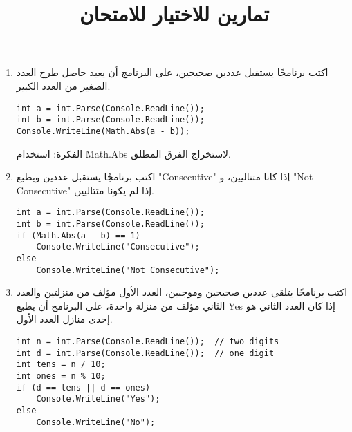 ﻿\documentclass[12pt]{article}
\title{تمارين للاختيار للامتحان}
\begin{document}
\maketitle
\thispagestyle{fancy}

\begin{enumerate}[itemsep=2em]
\item
اكتب برنامجًا يستقبل عددين صحيحين، على البرنامج أن يعيد حاصل طرح العدد الصغير من العدد الكبير.

\ifwithsols
\begin{boxSolution}
\begin{english}
\begin{verbatim}
int a = int.Parse(Console.ReadLine());
int b = int.Parse(Console.ReadLine());
Console.WriteLine(Math.Abs(a - b));
\end{verbatim}
\end{english}
الفكرة: استخدام \textenglish{Math.Abs} لاستخراج الفرق المطلق.
\end{boxSolution}
\fi


\item
اكتب برنامجًا يستقبل عددين ويطبع \textenglish{"Consecutive"} إذا كانا متتاليين، و \textenglish{"Not Consecutive"} إذا لم يكونا متتاليين.

\ifwithsols
\begin{boxSolution}
\begin{english}
\begin{verbatim}
int a = int.Parse(Console.ReadLine());
int b = int.Parse(Console.ReadLine());
if (Math.Abs(a - b) == 1)
    Console.WriteLine("Consecutive");
else
    Console.WriteLine("Not Consecutive");
\end{verbatim}
\end{english}
\end{boxSolution}
\fi


\item
اكتب برنامجًا يتلقى عددين صحيحين وموجبين، العدد الأول مؤلف من منزلتين والعدد الثاني مؤلف من منزلة واحدة، على البرنامج أن يطبع \textenglish{Yes} إذا كان العدد الثاني هو إحدى منازل العدد الأول.

\ifwithsols
\begin{boxSolution}
\begin{english}
\begin{verbatim}
int n = int.Parse(Console.ReadLine());  // two digits
int d = int.Parse(Console.ReadLine());  // one digit
int tens = n / 10;
int ones = n % 10;
if (d == tens || d == ones)
    Console.WriteLine("Yes");
else
    Console.WriteLine("No");
\end{verbatim}
\end{english}
\end{boxSolution}
\fi



\end{enumerate}
\end{document}
